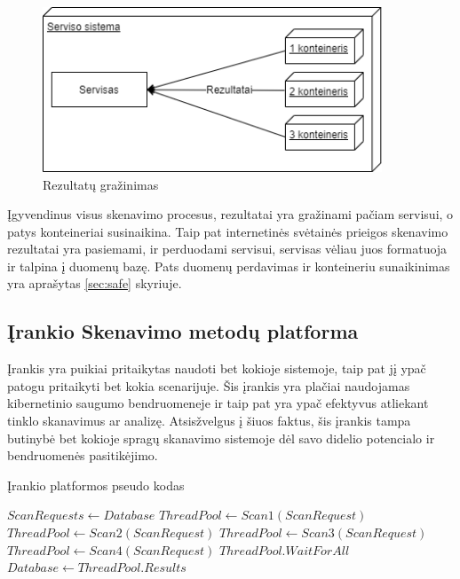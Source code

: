 \documentclass[a4paper,12pt,fleqn]{article}
\begin{document}
\begin{figure}[H]
	\centering
	\includegraphics[width=0.9\textwidth]{figs/3Containerlt.png}
	\caption{Rezultatų gražinimas}
	\label{fig:3Container}
\end{figure}

Įgyvendinus visus skenavimo procesus, rezultatai yra gražinami pačiam servisui, o patys konteineriai susinaikina. Taip pat internetinės svėtainės prieigos skenavimo rezultatai yra pasiemami, ir perduodami servisui, servisas vėliau juos formatuoja ir talpina į duomenų bazę. Pats duomenų perdavimas ir konteineriu sunaikinimas yra aprašytas \ref{sec:safe} skyriuje.


\subsection{Įrankio Skenavimo metodų platforma}

Įrankis yra puikiai pritaikytas naudoti bet kokioje sistemoje, taip pat jį ypač patogu pritaikyti bet kokia scenarijuje. Šis įrankis yra plačiai naudojamas kibernetinio saugumo bendruomeneje ir taip pat yra ypač efektyvus atliekant tinklo skanavimus ar analizę. Atsisžvelgus į šiuos faktus, šis įrankis tampa butinybė bet kokioje spragų skanavimo sistemoje dėl savo didelio potencialo ir bendruomenės pasitikėjimo.
\begin{algorithm}
	\caption{Įrankio platformos pseudo kodas}
	\label{alg:pseudo}
	\begin{algorithmic}
		\STATE $ScanRequests \gets Database$
		\STATE $ThreadPool \gets Scan1(ScanRequest)$
		\STATE $ThreadPool \gets Scan2(ScanRequest)$
		\STATE $ThreadPool \gets Scan3(ScanRequest)$
		\STATE $ThreadPool \gets Scan4(ScanRequest)$
		\STATE $ThreadPool. Wait For All$
		\ENDFOR
		\STATE $Database \gets ThreadPool.Results$
		\ENDIF
	\end{algorithmic}
\end{algorithm}
\end{document}
